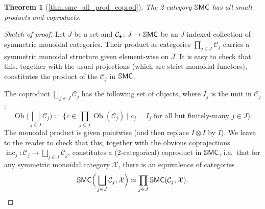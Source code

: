 \documentclass[11pt, oneside, article]{memoir}
\theoremstyle{plain}
\newtheorem*{theorem*}{Theorem}
\theoremstyle{definition}
\theoremstyle{remark}
\newcommand{\Set}[1]{\mathrm{#1}}%
\newcommand{\cat}[1]{\mathcal{#1}}%
\newcommand{\Cat}[1]{{\mathsf{#1}}}%
\newcommand{\CCat}[1]{\mathbb{\StrLeft{#1}{1}}\Cat{\StrGobbleLeft{#1}{1}}}%
\DeclareMathOperator{\ob}{\Set{Ob}}
\DeclareMathOperator{\inc}{inc}
\newcommand{\ssmc}{\CCat{SMC}}
\begin{document}
\begin{theorem*}[\ref{thm.smc_all_prod_coprod}]\label{page.smc_all_prod_coprod}
The 2-category $\ssmc$ has all small products and coproducts.
\end{theorem*}
\begin{proof}[Sketch of proof]
Let $J$ be a set and $\cat{C}_\bullet\colon J\to\ssmc$ be an $J$-indexed collection of symmetric monoidal categories. Their product as categories $\prod_{j\in J}\cat{C}_j$ carries a symmetric monoidal structure given element-wise on $J$. It is easy to check that this, together with the usual projections (which are strict monoidal functors), constitutes the product of the $\cat{C}_j$ in $\ssmc$.

The coproduct $\bigsqcup_{j\in J}\cat{C}_j$ has the following set of objects, where $I_j$ is the unit in $\cat{C}_j$:
\[
\ob\bigg(\bigsqcup_{j\in J}\cat{C}_j\bigg)\coloneqq
\bigg\{
c\in\prod_{j\in J}\ob(\cat{C}_j)
\;\bigg|\;
c_j=I_j\text{ for all but finitely-many }j\in J
\bigg\}.
\]
The monoidal product is given pointwise (and then replace $I\otimes I$ by $I$). We leave to the reader to check that this, together with the obvious coprojections $\inc_j\colon\cat{C}_j\to\bigsqcup_{j\in J}\cat{C}_j$, constitutes a (2-categorical) coproduct in $\ssmc$, i.e.\ that for any symmetric monoidal category $\cat{X}$, there is an equivalence of categories
\[
  \ssmc\Big(\bigsqcup_{j\in J}\cat{C}_j,\cat{X}\Big)\simeq\prod_{j\in J}\ssmc(\cat{C}_j,\cat{X}).
\qedhere
\]
\end{proof}




\printbibliography
\end{document}
